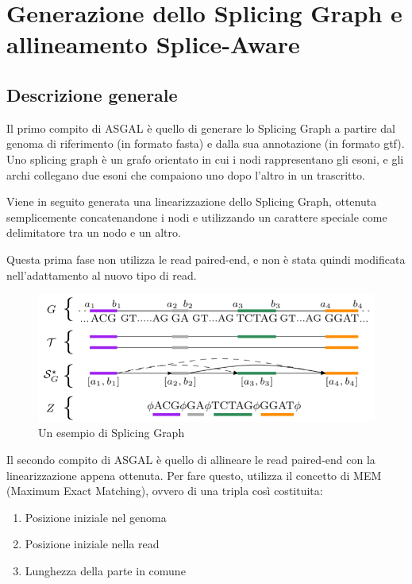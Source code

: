 \section{Generazione dello Splicing Graph e allineamento Splice-Aware}

\subsection{Descrizione generale}

Il primo compito di ASGAL è quello di generare lo Splicing Graph a partire dal genoma di riferimento (in formato fasta) e dalla sua annotazione (in formato gtf). Uno splicing graph è un grafo orientato in cui i nodi rappresentano gli esoni, e gli archi collegano due esoni che compaiono uno dopo l'altro in un trascritto. 

Viene in seguito generata una linearizzazione dello Splicing Graph, ottenuta semplicemente concatenandone i nodi e utilizzando un carattere speciale come delimitatore tra un nodo e un altro. 

Questa prima fase non utilizza le read paired-end, e non è stata quindi modificata nell'adattamento al nuovo tipo di read.

\begin{figure}[h!]
	\centering
	\includegraphics{images/splicinggraph.png}
  \caption{Un esempio di Splicing Graph}
  \label{fig:PairedEndReads}
\end{figure}

Il secondo compito di ASGAL è quello di allineare le read paired-end con la linearizzazione appena ottenuta. Per fare questo, utilizza il concetto di MEM (Maximum Exact Matching), ovvero di una tripla così costituita:
\begin{enumerate}
	\item Posizione iniziale nel genoma
	\item Posizione iniziale nella read
	\item Lunghezza della parte in comune
\end{enumerate}
	

